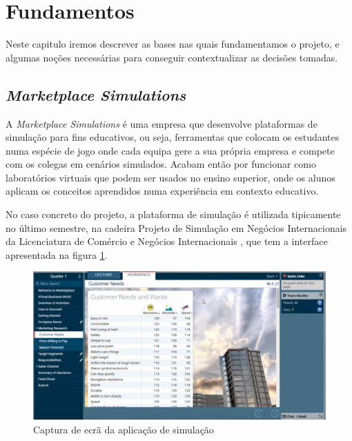\section{Fundamentos}
\label{sec:fundamentos}

Neste capitulo iremos descrever as bases nas quais fundamentamos o projeto, e algumas noções necessárias para conseguir contextualizar as decisões tomadas.

\subsection{\textit{Marketplace Simulations}}
\label{sec:marketplace}

A \textit{Marketplace Simulations} \cite{MarketplaceSim_2025} é uma empresa que desenvolve plataformas de simulação para fins educativos, ou seja, ferramentas que colocam os estudantes numa espécie de jogo onde cada equipa gere a sua própria empresa e compete com os colegas em cenários simulados. Acabam então por funcionar como laboratórios virtuais que podem ser usados no ensino superior, onde os alunos aplicam os conceitos aprendidos numa experiência em contexto educativo.

No caso concreto do projeto, a plataforma de simulação é utilizada tipicamente no último semestre, na cadeira Projeto de Simulação em Negócios Internacionais da Licenciatura de Comércio e Negócios Internacionais \cite{FUC_ISCAL_2025}, que tem a interface apresentada na figura \ref{fig:marketplace1}.

\begin{figure}[h]
    \centering
    \includegraphics[max width=\textwidth]{./img/marketplace1}
 \caption{Captura de ecrã da aplicação de simulação}
 \label{fig:marketplace1}
 \end{figure}

